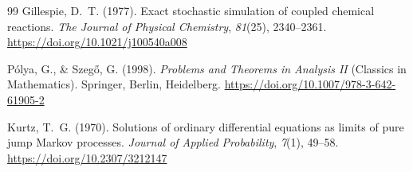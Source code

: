 \documentclass[11pt,a4paper]{article}
\theoremstyle{definition}\newtheorem{definition}[theorem]{Definition}
\theoremstyle{remark}\newtheorem{remark}[theorem]{Remark}
\begin{document}
\begin{thebibliography}{99}
Gillespie, D.~T. (1977).
Exact stochastic simulation of coupled chemical reactions.
\emph{The Journal of Physical Chemistry}, \emph{81}(25), 2340--2361.
\url{https://doi.org/10.1021/j100540a008}

P\'olya, G., \& Szeg\H{o}, G. (1998).
\emph{Problems and Theorems in Analysis II} (Classics in Mathematics).
Springer, Berlin, Heidelberg.
\url{https://doi.org/10.1007/978-3-642-61905-2}

Kurtz, T.~G. (1970).
Solutions of ordinary differential equations as limits of pure jump Markov processes.
\emph{Journal of Applied Probability}, \emph{7}(1), 49--58.
\url{https://doi.org/10.2307/3212147}
\end{thebibliography}
\end{document}
